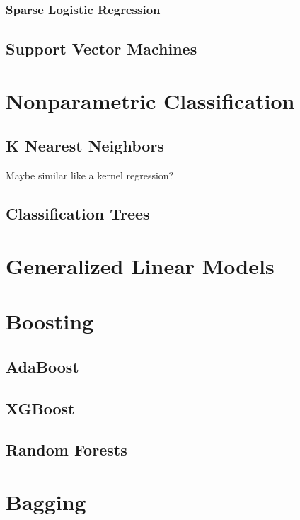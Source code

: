 \documentclass{article}
\begin{document}
    \subsubsection{Sparse Logistic Regression}

  \subsection{Support Vector Machines}

\section{Nonparametric Classification}

  \subsection{K Nearest Neighbors} 

    Maybe similar like a kernel regression?  

  \subsection{Classification Trees}


\section{Generalized Linear Models} 

\section{Boosting} 

  \subsection{AdaBoost} 

  \subsection{XGBoost}

  \subsection{Random Forests}

\section{Bagging}
\end{document}
